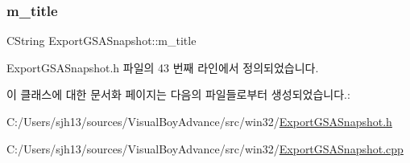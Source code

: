 \mbox{\label{class_export_g_s_a_snapshot_a8e7e31444aaab44e9216958e17fceb5d}} 
\subsubsection{\texorpdfstring{m\+\_\+title}{m\_title}}
{\footnotesize\ttfamily C\+String Export\+G\+S\+A\+Snapshot\+::m\+\_\+title}



Export\+G\+S\+A\+Snapshot.\+h 파일의 43 번째 라인에서 정의되었습니다.



이 클래스에 대한 문서화 페이지는 다음의 파일들로부터 생성되었습니다.\+:\begin{DoxyCompactItemize}
\item 
C\+:/\+Users/sjh13/sources/\+Visual\+Boy\+Advance/src/win32/\mbox{\hyperlink{_export_g_s_a_snapshot_8h}{Export\+G\+S\+A\+Snapshot.\+h}}\item 
C\+:/\+Users/sjh13/sources/\+Visual\+Boy\+Advance/src/win32/\mbox{\hyperlink{_export_g_s_a_snapshot_8cpp}{Export\+G\+S\+A\+Snapshot.\+cpp}}\end{DoxyCompactItemize}
